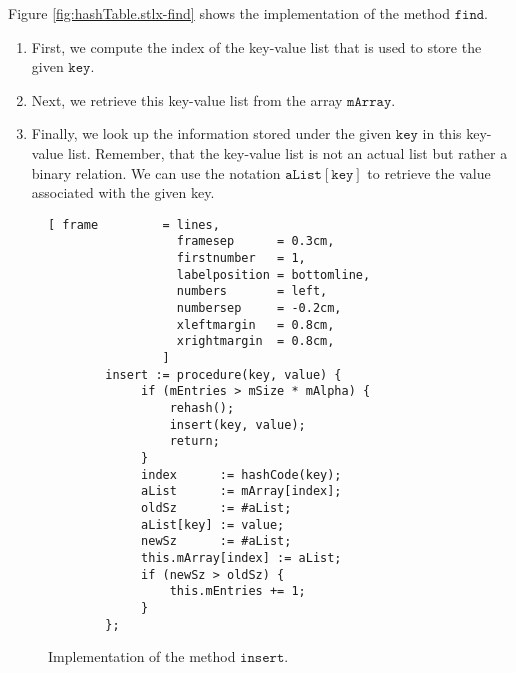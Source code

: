 Figure \ref{fig:hashTable.stlx-find} shows the implementation of the method $\mathtt{find}$.
\begin{enumerate}
\item First, we compute the index of the key-value list that is used to store the given
      $\mathtt{key}$.
\item Next, we retrieve this key-value list from the array $\mathtt{mArray}$.
\item Finally, we look up the information stored under the given $\mathtt{key}$ in this 
      key-value list.  Remember, that the key-value list is not an actual list but rather a binary
      relation.  We can use the notation $\mathtt{aList}[\mathtt{key}]$ to retrieve the value associated with
      the given key.
\end{enumerate}

\begin{figure}[!ht]
\centering
\begin{Verbatim}[ frame         = lines, 
                  framesep      = 0.3cm, 
                  firstnumber   = 1,
                  labelposition = bottomline,
                  numbers       = left,
                  numbersep     = -0.2cm,
                  xleftmargin   = 0.8cm,
                  xrightmargin  = 0.8cm,
                ]
        insert := procedure(key, value) {
             if (mEntries > mSize * mAlpha) {
                 rehash();
                 insert(key, value);
                 return;
             }
             index      := hashCode(key);
             aList      := mArray[index];
             oldSz      := #aList;
             aList[key] := value;
             newSz      := #aList;
             this.mArray[index] := aList;
             if (newSz > oldSz) {
                 this.mEntries += 1;
             }    
        };
\end{Verbatim}
\vspace*{-0.3cm}
\caption{Implementation of the method $\mathtt{insert}$.}
\label{fig:hashTable.stlx-insert}
\end{figure}

